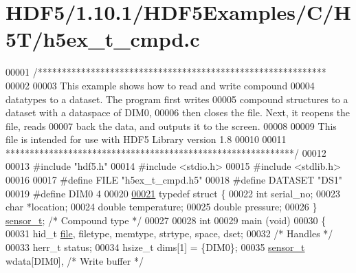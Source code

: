 \hypertarget{_h_d_f5_21_810_81_2_h_d_f5_examples_2_c_2_h5_t_2h5ex__t__cmpd_8c_source}{}\section{H\+D\+F5/1.10.1/\+H\+D\+F5\+Examples/\+C/\+H5\+T/h5ex\+\_\+t\+\_\+cmpd.c}
\label{_h_d_f5_21_810_81_2_h_d_f5_examples_2_c_2_h5_t_2h5ex__t__cmpd_8c_source}

\begin{DoxyCode}
00001 \textcolor{comment}{/************************************************************}
00002 \textcolor{comment}{}
00003 \textcolor{comment}{  This example shows how to read and write compound}
00004 \textcolor{comment}{  datatypes to a dataset.  The program first writes}
00005 \textcolor{comment}{  compound structures to a dataset with a dataspace of DIM0,}
00006 \textcolor{comment}{  then closes the file.  Next, it reopens the file, reads}
00007 \textcolor{comment}{  back the data, and outputs it to the screen.}
00008 \textcolor{comment}{}
00009 \textcolor{comment}{  This file is intended for use with HDF5 Library version 1.8}
00010 \textcolor{comment}{}
00011 \textcolor{comment}{ ************************************************************/}
00012 
00013 \textcolor{preprocessor}{#include "hdf5.h"}
00014 \textcolor{preprocessor}{#include <stdio.h>}
00015 \textcolor{preprocessor}{#include <stdlib.h>}
00016 
00017 \textcolor{preprocessor}{#define FILE            "h5ex\_t\_cmpd.h5"}
00018 \textcolor{preprocessor}{#define DATASET         "DS1"}
00019 \textcolor{preprocessor}{#define DIM0            4}
00020 
\hyperlink{structsensor__t}{00021} \textcolor{keyword}{typedef} \textcolor{keyword}{struct }\{
00022     \textcolor{keywordtype}{int}     serial\_no;
00023     \textcolor{keywordtype}{char}    *location;
00024     \textcolor{keywordtype}{double}  temperature;
00025     \textcolor{keywordtype}{double}  pressure;
00026 \} \hyperlink{structsensor__t}{sensor\_t};                                 \textcolor{comment}{/* Compound type */}
00027 
00028 \textcolor{keywordtype}{int}
00029 main (\textcolor{keywordtype}{void})
00030 \{
00031     hid\_t       \hyperlink{structfile}{file}, filetype, memtype, strtype, space, dset;
00032                                             \textcolor{comment}{/* Handles */}
00033     herr\_t      status;
00034     hsize\_t     dims[1] = \{DIM0\};
00035     \hyperlink{structsensor__t}{sensor\_t}    wdata[DIM0],                \textcolor{comment}{/* Write buffer */}

\end{DoxyCode}
